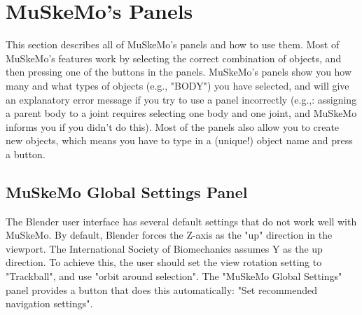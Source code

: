 \documentclass{article}
\begin{document}

\section{MuSkeMo's Panels}
This section describes all of MuSkeMo's panels and how to use them. Most of MuSkeMo's features work by selecting the correct combination of objects, and then pressing one of the buttons in the panels. MuSkeMo's panels show you how many and what types of objects (e.g., "BODY") you have selected, and will give an explanatory error message if you try to use a panel incorrectly (e.g.,: assigning a parent body to a joint requires selecting one body and one joint, and MuSkeMo informs you if you didn't do this). Most of the panels also allow you to create new objects, which means you have to type in a (unique!) object name and press a button. 

\subsection{MuSkeMo Global Settings Panel}
\label{sec:MSM_glob_settings}
The Blender user interface has several default settings that do not work well with MuSkeMo. By default, Blender forces the Z-axis as the "up" direction in the viewport. The International Society of Biomechanics assumes Y as the up direction. To achieve this, the user should set the view rotation setting to "Trackball", and use "orbit around selection". The "MuSkeMo Global Settings" panel provides a button that does this automatically: "Set recommended navigation settings". 
\end{document}
